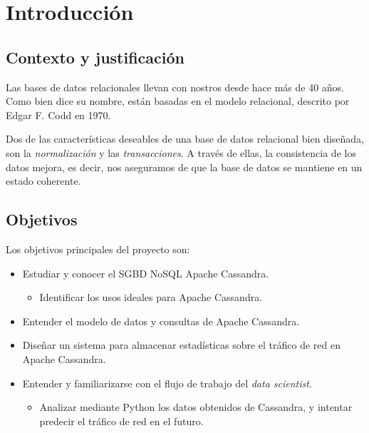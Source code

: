 \section{Introducción}
\label{sec:aim}

\subsection{Contexto y justificación}
\label{subsec:context}

Las bases de datos relacionales llevan con nostros desde hace más de 40 años.
Como bien dice su nombre, están basadas en el modelo relacional, descrito por
Edgar F. Codd en 1970.

Dos de las características deseables de una base de datos relacional bien
diseñada, son la \emph{normalización} y las \emph{transacciones}. A través de
ellas, la consistencia de los datos mejora, es decir, nos aseguramos de que la
base de datos se mantiene en un estado coherente. 




\subsection{Objetivos}
\label{subsec:objectives}

Los objetivos principales del proyecto son:

\begin{itemize}
    \item Estudiar y conocer el SGBD NoSQL Apache Cassandra.
      \begin{itemize}
      \item Identificar los usos ideales para Apache Cassandra.
      \end{itemize}
    \item Entender el modelo de datos y consultas de Apache Cassandra.
    \item Diseñar un sistema para almacenar estadísticas sobre el tráfico de red
      en Apache Cassandra.
    \item Entender y familiarizarse con el flujo de trabajo del \emph{data scientist}.
      \begin{itemize}
      \item Analizar mediante Python los datos obtenidos de Cassandra, y
        intentar predecir el tráfico de red en el futuro.
      \end{itemize}
\end{itemize}


